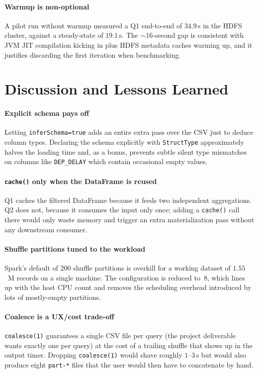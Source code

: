 \documentclass[conference]{IEEEtran}
\begin{document}
\paragraph{Warmup is non-optional}
A pilot run without warmup measured a Q1 end-to-end of
$34.9$\,s in the HDFS cluster, against a steady-state of
$19.1$\,s. The $\sim$16-second gap is consistent with JVM JIT
compilation kicking in plus HDFS metadata caches warming up,
and it justifies discarding the first iteration when benchmarking.

\section{Discussion and Lessons Learned}\label{sec:discussion}

\paragraph{Explicit schema pays off}
Letting \texttt{inferSchema=true} adds an entire extra pass over
the CSV just to deduce column types. Declaring the schema
explicitly with \texttt{StructType} approximately halves the
loading time and, as a bonus, prevents subtle silent type
mismatches on columns like \texttt{DEP\_DELAY} which contain
occasional empty values.

\paragraph{\texttt{cache()} only when the DataFrame is reused}
Q1 caches the filtered DataFrame because it feeds two independent
aggregations. Q2 does not, because it consumes the input only
once; adding a \texttt{cache()} call there would only waste
memory and trigger an extra materialization pass without any
downstream consumer.

\paragraph{Shuffle partitions tuned to the workload}
Spark's default of 200 shuffle partitions is overkill for a
working dataset of $1.55$~M records on a single machine. The
configuration is reduced to~8, which lines up with the host CPU
count and removes the scheduling overhead introduced by lots of
mostly-empty partitions.

\paragraph{Coalesce is a UX/cost trade-off}
\texttt{coalesce(1)} guarantees a single CSV file per query (the
project deliverable wants exactly one per query) at the cost of
a trailing shuffle that shows up in the output timer. Dropping
\texttt{coalesce(1)} would shave roughly $1$--$3$\,s but would
also produce eight \texttt{part-*} files that the user would
then have to concatenate by hand.
\end{document}
